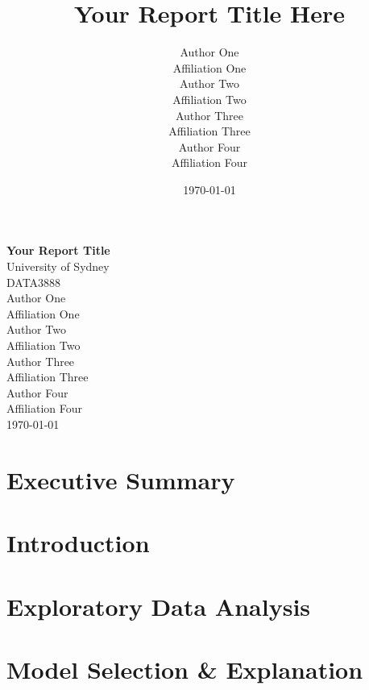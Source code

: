 \documentclass[12pt,a4paper,titlepage]{article}
\title{Your Report Title Here}
\author{
  Author One\\
  \small Affiliation One\\[1ex]
  Author Two\\
  \small Affiliation Two\\[1ex]
  Author Three\\
  \small Affiliation Three\\[1ex]
  Author Four\\
  \small Affiliation Four
}
\date{\today}
\begin{document}
\begin{titlepage}
  \vspace*{\fill}
  \centering
  {\Huge\bfseries Your Report Title}\\[1cm]
  {\Large University of Sydney}\\[0.5cm]
  {\Large DATA3888}\\[1.5cm]

  {\large
    Author One\\
    \small Affiliation One\\[1ex]
    \large 
    Author Two\\
    \small Affiliation Two\\[1ex]
    \large
    Author Three\\
    \small Affiliation Three\\[1ex]
    \large
    Author Four\\
    \small Affiliation Four
  }\\[2cm]

  {\large \today}
  \vspace*{\fill}
\end{titlepage}
\newpage

\tableofcontents
\newpage

\section*{Executive Summary}

\section*{Introduction}

\section*{Exploratory Data Analysis}

\section*{Model Selection \& Explanation}
\end{document}
